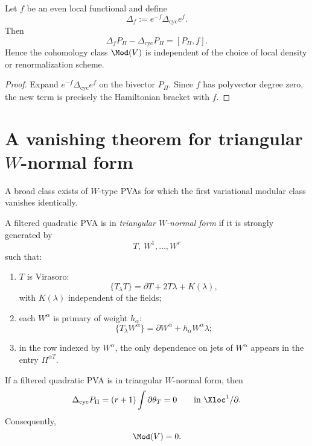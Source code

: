 \begin{lemma}\label{lem:gaugeind}
Let $f$ be an even local functional and define
\[
\Delta_f:=e^{-f}\Delta_{\mathrm{cyc}}e^f.
\]
Then
\[
\Delta_fP_\Pi-\Delta_{\mathrm{cyc}}P_\Pi=[P_\Pi,f].
\]
Hence the cohomology class $\Mod(V)$ is independent of the choice of local density
or renormalization scheme.
\end{lemma}

\begin{proof}
Expand $e^{-f}\Delta_{\mathrm{cyc}}e^f$ on the bivector $P_\Pi$. Since $f$ has polyvector
degree zero, the new term is precisely the Hamiltonian bracket with $f$.
\end{proof}

\section{A vanishing theorem for triangular $W$-normal form}

A broad class exists of $W$-type PVAs for which the first variational modular
class vanishes identically.

\begin{definition}
A filtered quadratic PVA is in \emph{triangular $W$-normal form} if it is strongly
generated by
\[
T,\ W^1,\dots,W^r
\]
such that:
\begin{enumerate}[leftmargin=2.4em]
\item $T$ is Virasoro:
\[
\{T_\lambda T\}=\partial T+2T\lambda+K(\lambda),
\]
with $K(\lambda)$ independent of the fields;
\item each $W^\alpha$ is primary of weight $h_\alpha$:
\[
\{T_\lambda W^\alpha\}=\partial W^\alpha+h_\alpha W^\alpha\lambda;
\]
\item in the row indexed by $W^\alpha$, the only dependence on jets of $W^\alpha$
appears in the entry $\Pi^{\alpha T}$.
\end{enumerate}
\end{definition}

\begin{theorem}\label{thm:triangular-vanishing}
If a filtered quadratic PVA is in triangular $W$-normal form, then
\[
\Delta_{\mathrm{cyc}}P_\Pi=(r+1)\int \partial\theta_T=0
\qquad\text{in }\Xloc^1/\partial.
\]
Consequently,
\[
\Mod(V)=0.
\]
\end{theorem}

